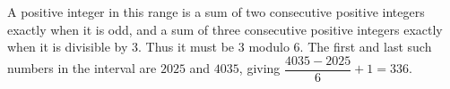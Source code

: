 A positive integer in this range is a sum of two consecutive positive integers exactly when it is odd, and a sum of three consecutive positive integers exactly when it is divisible by $3$. Thus it must be $3$ modulo $6$. The first and last such numbers in the interval are $2025$ and $4035$, giving $\dfrac{4035-2025}{6}+1=\boxed{336}$.
